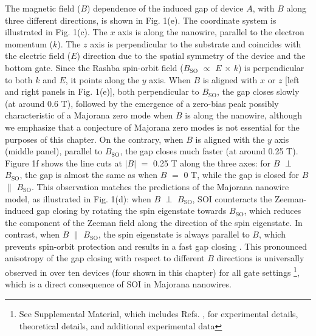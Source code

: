 The magnetic field ($B$) dependence of the induced gap of device $A$, with $B$ along three different directions, is shown in Fig. 1(e).
The coordinate system is illustrated in Fig. 1(c).
The $x$ axis is along the nanowire, parallel to the electron momentum ($k$).
The $z$ axis is perpendicular to the substrate and coincides with the electric field ($E$) direction due to the spatial symmetry of the device and the bottom gate.
Since the Rashba spin-orbit field ($B_{\mathrm{SO}}$ $\propto$ $E$ $\times$ $k$) is perpendicular to both $k$ and $E$, it points along the $y$ axis.
When $B$ is aligned with $x$ or $z$ [left and right panels in Fig. 1(e)], both perpendicular to $B_{\mathrm{SO}}$, the gap closes \mbox{slowly} (at around 0.6 T), followed by the emergence of a zero-bias peak possibly characteristic of a Majorana zero mode when $B$ is along the nanowire, although we emphasize that a conjecture of Majorana zero modes is not essential for the purposes of this chapter.
On the contrary, when $B$ is aligned with the $y$ axis (middle panel), parallel to $B_{\mathrm{SO}}$, the gap closes much faster (at around 0.25 T).
Figure 1f shows the line cuts at $|B|$ $=$ 0.25 T along the three axes: for $B$ $\perp$ $B_{\mathrm{SO}}$, the gap is almost the same as when $B$ $=$ 0 T, while the gap is closed for $B$ $\parallel$ $B_{\mathrm{SO}}$.
This observation matches the predictions of the Majorana nanowire model, as illustrated in Fig. 1(d): when $B$ $\perp$ $B_{\mathrm{SO}}$, SOI counteracts the Zeeman-induced gap closing by rotating the spin eigenstate towards $B_{\mathrm{SO}}$, which reduces the component of the Zeeman field along the direction of the spin eigenstate.
In contrast, when $B$ $\parallel$ $B_{\mathrm{SO}}$, the spin eigenstate is always parallel to $B$, which prevents spin-orbit protection and results in a fast gap closing \cite{Osca2014,Rex2014}.
This pronounced anisotropy of the gap closing with respect to different $B$ directions is universally observed in over ten devices (four shown in this chapter) for all gate settings
\footnote{See Supplemental Material, which includes Refs.
 \cite{Car2014,Flohr2011,Suyatin2007,HardGap,Liu2017,Danon2017,Hofstader1976,Gropp1996,Du1999,Prada2012,Pientka2012,Stanescu2012}, for experimental details, theoretical details, and additional experimental data}, which is a direct consequence of SOI in Majorana nanowires.
\nocite{Car2014,Flohr2011,Suyatin2007,HardGap,Liu2017,Danon2017,Hofstader1976,Gropp1996,Du1999,Prada2012,Pientka2012,Stanescu2012}

